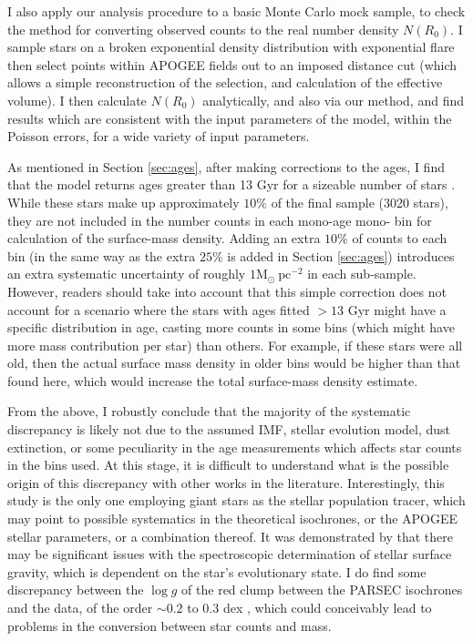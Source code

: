 I also apply our analysis procedure to a basic Monte Carlo mock sample, to check the method for converting observed counts to the real number density $N(R_0)$. I sample stars on a broken exponential density distribution with exponential flare then select points within APOGEE fields out to an imposed distance cut (which allows a simple reconstruction of the selection, and calculation of the effective volume). I then calculate $N(R_0)$ analytically, and also via our method, and find results which are consistent with the input parameters of the model, within the Poisson errors, for a wide variety of input parameters. 



As mentioned in Section \ref{sec:ages}, after making corrections to the ages, I find that the model returns ages greater than 13 Gyr for a sizeable number of stars \citep[][limit ages to 13 Gyr in their table]{2016MNRAS.456.3655M}. While these stars make up approximately $10\%$ of the final sample (3020 stars), they are not included in the number counts in each mono-age mono-\feh{} bin for calculation of the surface-mass density. Adding an extra $10\%$ of counts to each bin (in the same way as the extra $25\%$ is added in Section \ref{sec:ages}) introduces an extra systematic uncertainty of roughly $1 \mathrm{M_{\odot}\ pc^{-2}}$ in each \afe{} sub-sample. However, readers should take into account that this simple correction does not account for a scenario where the stars with ages fitted $> 13$ Gyr might have a specific distribution in age, casting more counts in some bins (which might have more mass contribution per star) than others. For example, if these stars were all old, then the actual surface mass density in older bins would be higher than that found here, which would increase the total surface-mass density estimate. 

From the above, I robustly conclude that the majority of the systematic discrepancy is likely not due to the assumed IMF, stellar evolution model, dust extinction, or some peculiarity in the age measurements which affects star counts in the bins used. At this stage, it is difficult to understand what is the possible origin of this discrepancy with other works in the literature. Interestingly, this study is the only one employing giant stars as the stellar population tracer, which may point to possible systematics in the theoretical isochrones, or the APOGEE stellar parameters, or a combination thereof. It was demonstrated by \citet{2017A&A...597L...3M} that there may be significant issues with the spectroscopic determination of stellar surface gravity, which is dependent on the star's evolutionary state. I do find some discrepancy between the $\log{g}$ of the red clump between the PARSEC isochrones and the data, of the order $\sim 0.2$ to $0.3$ dex \citep[similar to that found by][albeit based on APOGEE-DR13 data]{2017A&A...597L...3M}, which could conceivably lead to problems in the conversion between star counts and mass. 

